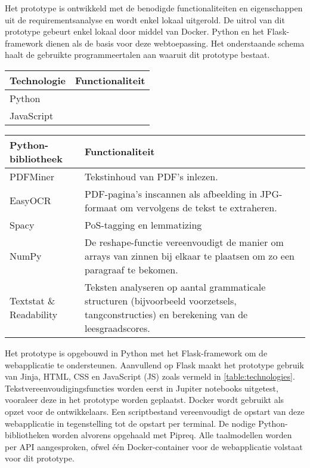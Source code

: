 Het prototype is ontwikkeld met de benodigde functionaliteiten en eigenschappen uit de requirementsanalyse en wordt enkel lokaal uitgerold. De uitrol van dit prototype gebeurt enkel lokaal door middel van Docker. Python en het Flask-framework dienen als de basis voor deze webtoepassing. Het onderstaande schema haalt de gebruikte programmeertalen aan waaruit dit prototype bestaat. 

\begin{center}
	\begin{tabular}{ | m{4cm} | m{12cm} | } 
		\hline
		\textbf{Technologie} & \textbf{Functionaliteit} \\
		\hline
		Python & \\
		\hline
		JavaScript
		\hline
	\end{tabular}
	\label{table:technologies}
\end{center}



\begin{center}
	\begin{tabular}{ | m{4cm} | m{12cm} | } 
		\hline
		\textbf{Python-bibliotheek} & \textbf{Functionaliteit} \\
		\hline
		PDFMiner 				& Tekstinhoud van PDF's inlezen. \\ 
		EasyOCR					& PDF-pagina's inscannen als afbeelding in JPG-formaat om vervolgens de tekst te extraheren. \\
		Spacy 					& PoS-tagging en lemmatizing \\
		NumPy 					& De reshape-functie vereenvoudigt de manier om arrays van zinnen bij elkaar te plaatsen om zo een paragraaf te bekomen. \\
		Textstat \& Readability	& Teksten analyseren op aantal grammaticale structuren (bijvoorbeeld voorzetsels, tangconstructies) en berekening van de leesgraadscores. \\
		\hline
	\end{tabular}
	\label{table:python-libraries}
\end{center}

Het prototype is opgebouwd in Python met het Flask-framework om de webapplicatie te ondersteunen. Aanvullend op Flask maakt het prototype gebruik van Jinja, HTML, CSS en JavaScript (JS) zoals vermeld in \ref{table:technologies}. Tekstvereenvoudigingsfuncties worden eerst in Jupiter notebooks uitgetest, vooraleer deze in het prototype worden geplaatst. Docker wordt gebruikt als opzet voor de ontwikkelaars. Een scriptbestand vereenvoudigt de opstart van deze webapplicatie in tegenstelling tot de opstart per terminal. De nodige Python-bibliotheken worden alvorens opgehaald met Pipreq. Alle taalmodellen worden per API aangesproken, ofwel één Docker-container voor de webapplicatie volstaat voor dit prototype.



